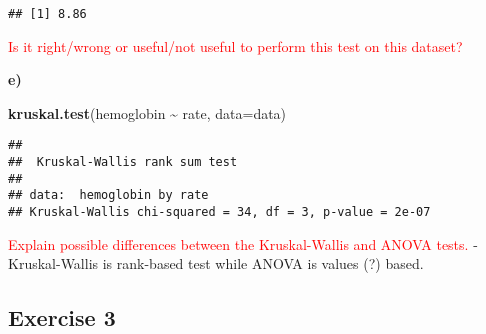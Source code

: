 \documentclass[
]{article}
\newenvironment{Shaded}{\begin{snugshade}}{\end{snugshade}}
\newcommand{\AttributeTok}[1]{\textcolor[rgb]{0.13,0.29,0.53}{#1}}
\newcommand{\CommentTok}[1]{\textcolor[rgb]{0.56,0.35,0.01}{\textit{#1}}}
\newcommand{\DecValTok}[1]{\textcolor[rgb]{0.00,0.00,0.81}{#1}}
\newcommand{\FunctionTok}[1]{\textcolor[rgb]{0.13,0.29,0.53}{\textbf{#1}}}
\newcommand{\NormalTok}[1]{#1}
\newcommand{\OtherTok}[1]{\textcolor[rgb]{0.56,0.35,0.01}{#1}}
\newcommand{\SpecialCharTok}[1]{\textcolor[rgb]{0.81,0.36,0.00}{\textbf{#1}}}
\newcommand{\StringTok}[1]{\textcolor[rgb]{0.31,0.60,0.02}{#1}}
\begin{document}
\begin{Shaded}
\end{Shaded}

\begin{verbatim}
## [1] 8.86
\end{verbatim}

\textcolor{red}{Is it right/wrong or useful/not useful to perform this test on this dataset?}

\textbf{e)}

\begin{Shaded}
\begin{Highlighting}[]
\FunctionTok{kruskal.test}\NormalTok{(hemoglobin }\SpecialCharTok{\textasciitilde{}}\NormalTok{ rate, }\AttributeTok{data=}\NormalTok{data)}
\end{Highlighting}
\end{Shaded}

\begin{verbatim}
## 
##  Kruskal-Wallis rank sum test
## 
## data:  hemoglobin by rate
## Kruskal-Wallis chi-squared = 34, df = 3, p-value = 2e-07
\end{verbatim}

\textcolor{red}{Explain possible differences between the Kruskal-Wallis and ANOVA tests.}
- Kruskal-Wallis is rank-based test while ANOVA is values (?) based.

\hypertarget{exercise-3}{%
\subsection{Exercise 3}\label{exercise-3}}

\begin{Shaded}
\end{Shaded}
\end{document}
